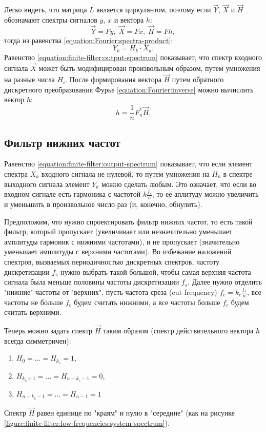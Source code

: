 Легко видеть, что матрица $L$ является циркулянтом, поэтому если $\vec{Y}$,  $\vec{X}$ и $\vec{H}$ обозначают спектры сигналов $y$, $x$ и вектора $h$:
$$
\vec{Y} = F y, \; \vec{X} = F x, \; \vec{H} = F h,
$$
тогда из равенства \eqref{equation:Fourier:spectra-product}:
\begin{equation}
    \label{equation:finite-filter:output-spectrum}
    Y_k = H_k \cdot X_k.
\end{equation}
Равенство \eqref{equation:finite-filter:output-spectrum} показывает, что спектр входного сигнала $\vec{X}$ может быть модифицирован произвольным образом, путем умножения на
разные числа $H_i$. После формирования вектора $\vec{H}$ путем обратного дискретного преобразования Фурье \eqref{equation:Fourier:inverse} можно вычислить вектор $h$:
$$
h = \frac{1}{n} F_n^* \vec{H}.
$$

\subsection{Фильтр нижних частот}

Равенство \eqref{equation:finite-filter:output-spectrum} показывает, что если элемент спектра $X_k$ входного сигнала не нулевой, то путем умножения на $H_k$ в спектре
выходного сигнала элемент $Y_k$ можно сделать любым. Это означает, что если во входном сигнале есть гармоника с частотой $k \frac{f_s}{n}$, то её аплитуду можно увеличить и
уменьшить в произвольное число раз (и, конечно, обнулить).

Предположим, что нужно спроектировать фильтр нижних частот, то есть такой фильтр, который пропускает (увеличивает или незначительно уменьшает амплитуды гармоник с нижними
частотами), и не пропускает (значительно уменьшает амплитуды с верхними частотами). Во избежание наложений спектров, вызваемых периодичностью дискретных спектров, частоту
дискретизации $f_s$ нужно выбрать такой большой, чтобы самая верхняя частота сигнала была меньше половины частоты дискретизации $f_s$. Далее нужно отделить "нижние"{}
частоты от "верхних"{}, пусть частота среза (cut frequency) $f_c = k_c \frac{f_s}{n}$, все частоты не больше $f_c$ будем считать нижними, а все частоты больше $f_c$ будем
считать верхними.

Теперь можно задать спектр $\vec{H}$ таким образом (спектр действительного вектора $h$ всегда симметричен):
\begin{enumerate}
    \item $H_0 = \dots = H_{k_c} = 1$,
    \item $H_{k_c + 1} = \dots = H_{n - k_c - 1} = 0$,
    \item $H_{n - k_c - 1} = \dots = H_{n-1} = 1$
\end{enumerate}
Спектр $\vec{H}$ равен единице по "краям"{} и нулю в "середине"{} (как на рисунке \ref{figure:finite-filter:low-frequencies:system-spectrum}).

